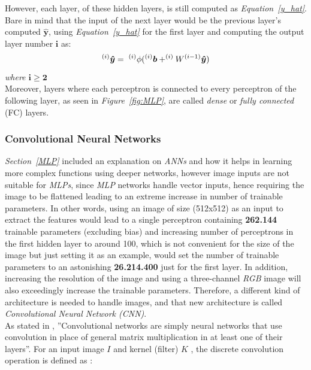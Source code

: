 \documentclass[12pt]{extarticle}
\begin{document}
	However, each layer, of these hidden layers, is still computed as \emph{Equation~\ref{y_hat}}. Bare in mind that the input of the next layer would be the previous layer's computed $\bm{\hat{y}}$, using \emph{Equation~\ref{y_hat}} for the first layer and computing the output layer number $\bm{i}$ as:
	\begin{equation}\label{ANN_y_hat}
		^{(i)}\bm{\hat{y}} = \hspace{1mm} ^{(i)}\phi(^{(i)}\bm{b}+ ^{(i)}W^{(i-1)}\bm{\hat{y}})
	\end{equation}
	\emph{where $\bm{i \geq 2}$}\\
	Moreover, layers where each perceptron is connected to every perceptron of the following layer, as seen in \emph{Figure~\ref{fig:MLP}}, are called \emph{dense} or \emph{fully connected} (FC) layers.
	
	\subsubsection{Convolutional Neural Networks}\label{CNN}	
	\emph{Section~\ref{MLP}} included an explanation on \emph{ANNs} and how it helps in learning more complex functions using deeper networks, however image inputs are not suitable for \emph{MLPs}, since \emph{MLP} networks handle vector inputs, hence requiring the image to be flattened leading to an extreme increase in number of trainable parameters. In other words, using an image of size (512x512) as an input to extract the features would lead to a single perceptron containing \textbf{262.144} trainable parameters (excluding bias) and increasing number of perceptrons in the first hidden layer to around 100, which is not convenient for the size of the image but just setting it as an example, would set the number of trainable parameters to an astonishing \textbf{26.214.400} just for the first layer. In addition, increasing the resolution of the image and using a three-channel \emph{RGB} image will also exceedingly increase the trainable parameters. Therefore, a different kind of architecture is needed to handle images, and that new architecture is called \emph{Convolutional Neural Network (CNN)}.\\[5mm]
	As stated in \cite{DL}, ”Convolutional networks are simply neural networks that use convolution in place of general matrix multiplication in at least one of their layers”. For an input image $I$ and kernel (filter) $K$ , the discrete convolution operation is defined as \cite{DL}:
\end{document}
